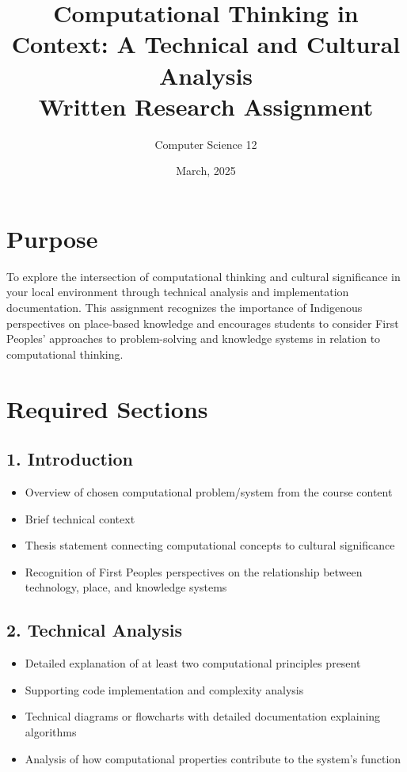 \documentclass[12pt]{article}
\title{Computational Thinking in Context: A Technical and Cultural Analysis\\
\large Written Research Assignment}
\author{Computer Science 12}
\date{March, 2025}
\begin{document}
\maketitle

\section*{Purpose}
To explore the intersection of computational thinking and cultural significance in your local environment through technical analysis and implementation documentation. This assignment recognizes the importance of Indigenous perspectives on place-based knowledge and encourages students to consider First Peoples' approaches to problem-solving and knowledge systems in relation to computational thinking.

\section*{Required Sections}

\subsection*{1. Introduction }
\begin{itemize}
    \item Overview of chosen computational problem/system from the course content
    \item Brief technical context
    \item Thesis statement connecting computational concepts to cultural significance
    \item Recognition of First Peoples perspectives on the relationship between technology, place, and knowledge systems
\end{itemize}

\subsection*{2. Technical Analysis }
\begin{itemize}
    \item Detailed explanation of at least two computational principles present
    \item Supporting code implementation and complexity analysis
    \item Technical diagrams or flowcharts with detailed documentation explaining algorithms
    \item Analysis of how computational properties contribute to the system's function
\end{itemize}
\end{document}
